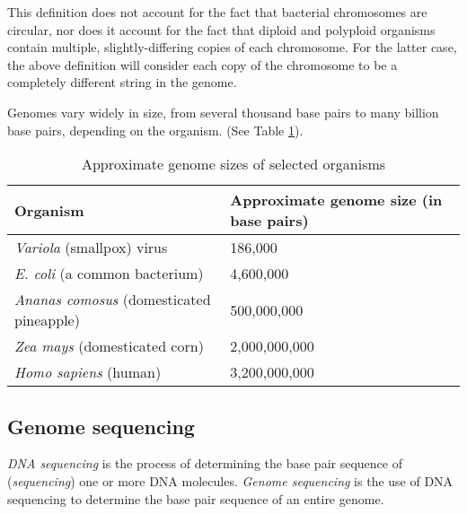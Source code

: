 \documentclass[10pt]{article}
\begin{document}
This definition does not account for the fact that bacterial chromosomes are
circular, nor does it account for the fact that diploid and polyploid organisms
contain multiple, slightly-differing copies of each chromosome.  For the latter
case, the above definition will consider each copy of the chromosome to be a
completely different string in the genome.

Genomes vary widely in size, from several thousand base pairs to many billion
base pairs, depending on the organism.  (See Table \ref{tab:GenomeSizes}).

\begin{table}[H]
	\begin{center}
		\begin{tabular}{|l|p{4.5cm}|}
			\hline
			{\bf Organism} & {\bf Approximate genome size (in base
			pairs)} \\
			\hline
			{\it Variola} (smallpox) virus &  186,000 \\
			\hline
			{\it E. coli} (a common bacterium) & 4,600,000 \\
			\hline
			{\it Ananas comosus} (domesticated pineapple) & 500,000,000 \\
			\hline
			{\it Zea mays} (domesticated corn) & 2,000,000,000 \\
			\hline
			{\it Homo sapiens} (human)       &  3,200,000,000 \\
			\hline
		\end{tabular}
	\end{center}
	\caption{Approximate genome sizes of selected organisms}
	\label{tab:GenomeSizes}
\end{table}

\subsection{Genome sequencing}

{\it DNA sequencing} is the process of determining the base pair sequence of
({\it sequencing}) one or more DNA molecules.  {\it Genome sequencing} is the use
of DNA sequencing to determine the base pair sequence of an entire genome.
\end{document}
